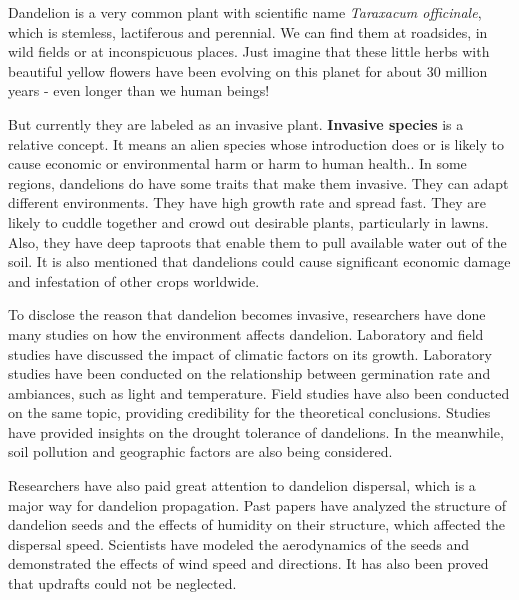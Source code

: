 \documentclass[12pt]{article}
\begin{document}
	Dandelion is a very common plant with scientific name \textit{Taraxacum officinale}, which is stemless, lactiferous and perennial\autocite{stewart2002biology}.  We can find them at roadsides, in wild fields or at inconspicuous places.  Just imagine that these little herbs with beautiful yellow flowers have been evolving on this planet for about 30 million years\autocite{dandelionhistory} - even longer than we human beings!
	
	But currently they are labeled as an invasive plant.  \textbf{Invasive species} is a relative concept.  It means an alien species whose introduction does or is likely to cause economic or environmental harm or harm to human health.\autocite{defInvasive}.  In some regions, dandelions do have some traits that make them invasive.  They can adapt different environments.  They have high growth rate and spread fast. They are likely to cuddle together and crowd out desirable plants, particularly in lawns.  Also, they have deep taproots that enable them to pull available water out of the soil.  It is also mentioned that dandelions could cause significant economic damage and infestation of other crops worldwide\autocite{stewart2002biology}.
	
	To disclose the reason that dandelion becomes invasive, researchers have done many studies on how the environment affects dandelion.  Laboratory and field studies have discussed the impact of climatic factors on its growth. Laboratory studies have been conducted on the relationship between germination rate and ambiances, such as light and temperature\autocite{letchamo1996light}.  Field studies have also been conducted on the same topic, providing credibility for the theoretical conclusions\autocite{yoneda1991effects}.  Studies have provided insights on the drought tolerance of dandelions\autocite{brock2005drought}. In the meanwhile, soil pollution and geographic factors are also being considered\autocite{verhoeven2013geographic}.
	
	Researchers have also paid great attention to dandelion dispersal, which is a major way for dandelion propagation.  Past papers have analyzed the structure of dandelion seeds and the effects of humidity on their structure, which affected the dispersal speed\autocite{greene1989model}. Scientists have modeled the aerodynamics of the seeds and demonstrated the effects of wind speed and directions.  It has also been proved that updrafts could not be neglected\autocite{tackenberg2003dandelion}.
	
\end{document}
